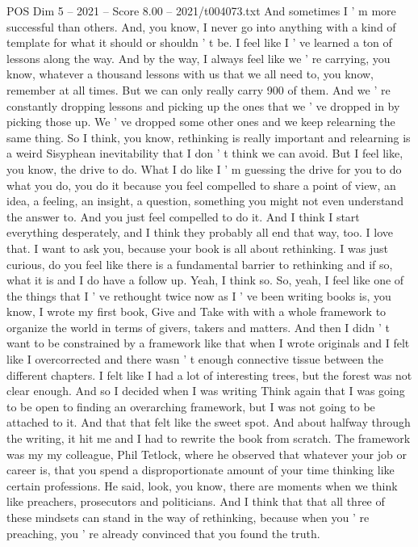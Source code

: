 \begin{textsample}{POS Dim 5 – 2021 – Score 8.00 – 2021/t004073.txt}
And sometimes I ' m more successful than others.
And, you know, I never go into anything with a kind of template for what it should or shouldn ' t be.
I feel like I ' ve learned a ton of lessons along the way.
And by the way, I always feel like we ' re carrying, you know, whatever a thousand lessons with us that we all need to, you know, remember at all times.
But we can only really carry 900 of them.
And we ' re constantly dropping lessons and picking up the ones that we ' ve dropped in by picking those up.
We ' ve dropped some other ones and we keep relearning the same thing.
So I think, you know, rethinking is really important and relearning is a weird Sisyphean inevitability that I don ' t think we can avoid.
But I feel like, you know, the drive to do.
What I do like I ' m guessing the drive for you to do what you do, you do it because you feel compelled to share a point of view, an idea, a feeling, an insight, a question, something you might not even understand the answer to.
And you just feel compelled to do it.
And I think I start everything desperately, and I think they probably all end that way, too.
I love that.
I want to ask you, because your book is all about rethinking.
I was just curious, do you feel like there is a fundamental barrier to rethinking and if so, what it is and I do have a follow up.
Yeah, I think so.
So, yeah, I feel like one of the things that I ' ve rethought twice now as I ' ve been writing books is, you know, I wrote my first book, Give and Take with with a whole framework to organize the world in terms of givers, takers and matters.
And then I didn ' t want to be constrained by a framework like that when I wrote originals and I felt like I overcorrected and there wasn ' t enough connective tissue between the different chapters.
I felt like I had a lot of interesting trees, but the forest was not clear enough.
And so I decided when I was writing Think again that I was going to be open to finding an overarching framework, but I was not going to be attached to it.
And that that felt like the sweet spot.
And about halfway through the writing, it hit me and I had to rewrite the book from scratch.
The framework was my my colleague, Phil Tetlock, where he observed that whatever your job or career is, that you spend a disproportionate amount of your time thinking like certain professions.
He said, look, you know, there are moments when we think like preachers, prosecutors and politicians.
And I think that that all three of these mindsets can stand in the way of rethinking, because when you ' re preaching, you ' re already convinced that you found the truth.

\end{textsample}
